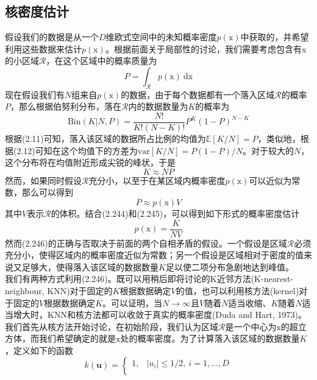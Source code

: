 \documentclass[b5paper]{book}
\numberwithin{equation}{chapter}
\newcommand {\bx} {\boldsymbol{\mathrm{x}}}
\newcommand {\rmd} {\mathrm{d}}
\newcommand {\calR} {\mathcal{R}}
\begin{document}
	\subsection{核密度估计}
	\textnormal{假设我们的数据是从一个$D$维欧式空间中的未知概率密度$p(\bx)$中获取的，并希望利用这些数据来估计$p(\bx)$。根据前面关于局部性的讨论，我们需要考虑包含有$\bx$的小区域$\mathcal{R}$，在这个区域中的概率质量为
	\begin{equation}
		P = \int_{\calR} p(\bx) \ \rmd \bx
	\end{equation}
	现在假设我们有$N$组来自$p(\bx)$的数据，由于每个数据都有一个落入区域$\calR$的概率$P$，那么根据伯努利分布，落在$\calR$内的数据数量为$K$的概率为
	\begin{equation}
		\mathrm{Bin}(K|N,P)=\frac{N!}{K!(N-K)!}P^K(1-P)^{N-K}
	\end{equation}
	根据(2.11)可知，落入该区域的数据所占比例的均值为$\mathbb{E}[K/N]=P$，类似地，根据(2.12)可知在这个均值下的方差为$\mathrm{var}[K/N]=P(1-P)/N$。对于较大的$N$，这个分布将在均值附近形成尖锐的峰状，于是
	\begin{equation}
		K \approx NP
	\end{equation}
	然而，如果同时假设$\calR$充分小，以至于在某区域内概率密度$p(\bx)$可以近似为常数，那么可以得到
	\begin{equation}
		P \approx p(\bx)V
	\end{equation}
	其中$V$表示$\calR$的体积。结合(2.244)和(2.245)，可以得到如下形式的概率密度估计
	\begin{equation}
		p(\bx)=\frac{K}{NV}
	\end{equation}
	然而(2.246)的正确与否取决于前面的两个自相矛盾的假设。一个假设是区域$\calR$必须充分小，使得区域内的概率密度近似为常数；另一个假设是区域相对于密度的值来说又足够大，使得落入该区域的数据数量$K$足以使二项分布急剧地达到峰值。\\
	\indent 我们有两种方式利用(2.246)。既可以用稍后即将讨论的K近邻方法(K-nearest-neighbour, KNN)对于固定的$K$根据数据确定$V$的值，也可以利用核方法(kernel)对于固定的$V$根据数据确定$K$。可以证明，当$N \rightarrow \infty$且$V$随着$N$适当收缩、$K$随着$N$适当增大时，KNN和核方法都可以收敛于真实的概率密度(Duda and Hart, 1973)。\\
	\indent 我们首先从核方法开始讨论，在初始阶段，我们认为区域$\calR$是一个中心为$\bx$的超立方体，而我们希望确定的就是$\bx$处的概率密度。为了计算落入该区域的数据数量$K$，定义如下的函数
	\begin{equation}
		k(\mathbf{u})=\begin{cases}
		1,&|u_i|\leqslant 1/2,\ i=1,...,D\\

\end{cases}
\end{equation}}
\end{document}
